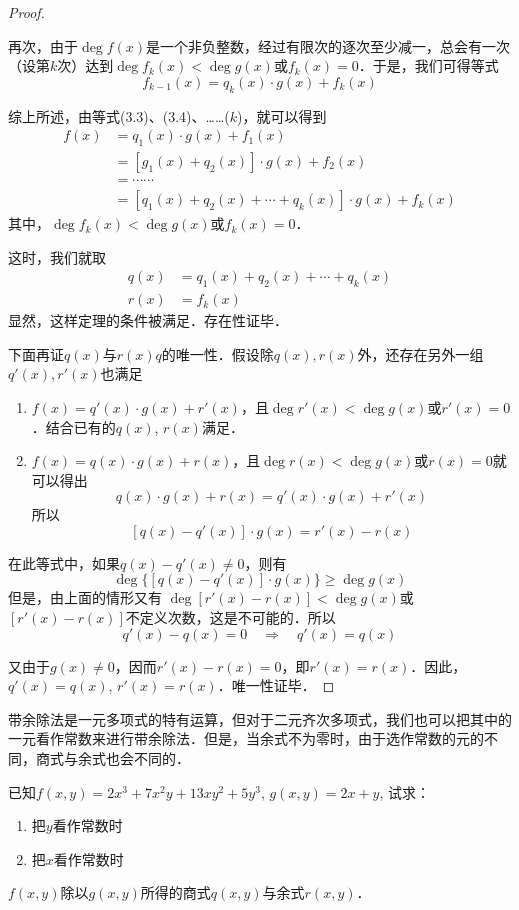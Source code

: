 \begin{proof}
\begin{enumerate}
再次，由于$\deg f(x)$是一个非负整数，经过有限次的逐次至少减一，总会有一次（设第$k$次）达到$\deg f_k(x)<\deg g(x)$或$f_k(x)=0$．于是，我们可得等式
\begin{equation*}
    f_{k-1}(x)=q_k(x)\cdot g(x)+f_k(x) \tag{$k$}
\end{equation*}

综上所述，由等式(3.3)、(3.4)、……($k$)，就可以得到
\[\begin{split}
   f(x)&=q_1(x)\cdot g(x)+f_1(x)\\
   &=[g_1(x)+q_2(x)]\cdot g(x)+f_2(x)\\ 
&=\cdots\cdots\\
&=[q_1(x)+q_2(x)+\cdots+q_k(x)]\cdot g(x)+f_k(x)
\end{split}\]
其中，$\deg f_k(x)<\deg g(x)$或$f_k(x)=0$．

这时，我们就取
\[\begin{split}
    q(x)&=q_1(x)+q_2(x)+\cdots +q_k(x)\\
    r(x)&=f_k(x)
\end{split}\]
显然，这样定理的条件被满足．存在性证毕．
\end{enumerate}

下面再证$q(x)$与$r(x)q$的唯一性．假设除$q(x),r(x)$外，还存在另外一组$q'(x),r'(x)$也满足
\begin{enumerate}
    \item $f(x)=q'(x)\cdot g(x)+r'(x)$，且$\deg r'(x)<\deg g(x)$或$r'(x)=0$．结合已有的$q(x)$, $r(x)$满足．
    \item $f(x)=q(x)\cdot g(x)+r(x)$，且$\deg r(x)<\deg g(x)$或$r(x)=0$就可以得出
\[q(x)\cdot g(x)+r(x)=q'(x)\cdot g(x)+r'(x)\]
所以
\[[q(x)-q'(x)]\cdot g(x)=r'(x)-r(x)\]
\end{enumerate}

在此等式中，如果$q(x)-q'(x)\ne 0$，则有
\[\deg\{[q(x)-q'(x)]\cdot g(x)\}\ge \deg g(x)\]
但是，由上面的情形又有
$\deg[r'(x)-r(x)]<\deg g(x)$或$[r'(x)-r(x)]$不定义次数，这是不可能的．所以
\[q'(x)-q(x)=0\quad \Rightarrow\quad q'(x)=q(x)\]

又由于$g(x)\ne 0$，因而$r'(x)-r(x)=0$，即$r'(x)=r(x)$．因此，$q'(x)=q(x)$, $r'(x)=r(x)$．唯一性证毕．
\end{proof}

带余除法是一元多项式的特有运算，但对于二元齐次多项式，我们也可以把其中的一元看作常数来进行带余除法．但是，当余式不为零时，由于选作常数的元的不同，商式与余式也会不同的．

\begin{example}
 已知$f(x,y)=2x^3+7x^2y+13xy^2+5y^3$, $g(x,y)=2x+y$, 试求：
 \begin{enumerate}
     \item 把$y$看作常数时
     \item 把$x$看作常数时
 \end{enumerate}
$f(x,y)$除以$g(x,y)$所得的商式$q(x,y)$与余式$r(x,y)$．
\end{example}

